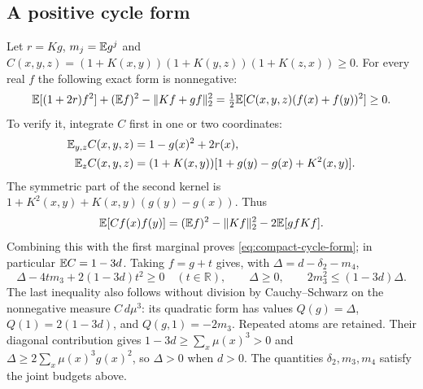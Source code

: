 \subsection{A positive cycle form}\label{loc:S6}
Let $r=Kg$, $m_j=\mathbb E g^j$ and
$C(x,y,z)=(1+K(x,y))(1+K(y,z))(1+K(z,x))\ge0$.
For every real $f$ the following exact form is nonnegative:
\begin{equation}\label{eq:compact-cycle-form}
 \mathbb E[(1+2r)f^2]+(\mathbb E f)^2-\|Kf+gf\|_2^2
 =\tfrac12\mathbb E[C(x,y,z)(f(x)+f(y))^2]\ge0.
\end{equation}
To verify it, integrate $C$ first in one or two coordinates:
\begin{align*}
 \mathbb E_{y,z}C(x,y,z)&=1-g(x)^2+2r(x),\\
 \mathbb E_zC(x,y,z)&=(1+K(x,y))[1+g(y)-g(x)+K^2(x,y)].
\end{align*}
The symmetric part of the second kernel is
$1+K^2(x,y)+K(x,y)(g(y)-g(x))$. Thus
\[
 \mathbb E[Cf(x)f(y)]=(\mathbb E f)^2-\|Kf\|_2^2-2\mathbb E[gfKf].
\]
Combining this with the first marginal proves
\eqref{eq:compact-cycle-form}; in particular $\mathbb E C=1-3d$.
Taking $f=g+t$ gives, with $\Delta=d-\delta_{2}-m_4$,
\[
 \Delta-4tm_3+2(1-3d)t^2\ge0\quad(t\in\mathbb R),
 \qquad \Delta\ge0,\qquad 2m_3^2\le(1-3d)\Delta.
\]
The last inequality also follows without division by Cauchy--Schwarz on
the nonnegative measure $C\,d\mu^3$: its quadratic form has values
$Q(g)=\Delta$, $Q(1)=2(1-3d)$, and $Q(g,1)=-2m_3$.
Repeated atoms are retained. Their diagonal contribution gives
$1-3d\ge\sum_x\mu(x)^3>0$ and
$\Delta\ge2\sum_x\mu(x)^3g(x)^2$, so $\Delta>0$ when $d>0$.
The quantities $\delta_{2},m_3,m_4$ satisfy the joint budgets above.
